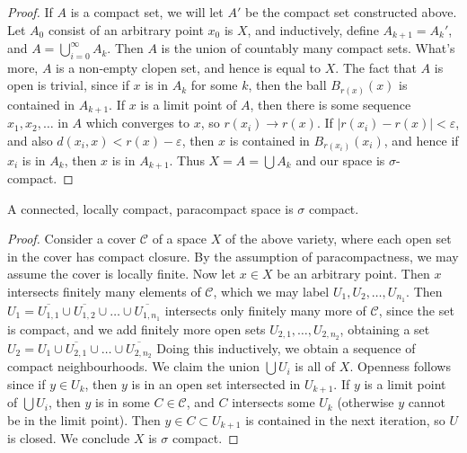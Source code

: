 \begin{proof}
    If $A$ is a compact set, we will let $A'$ be the compact set constructed above. Let $A_0$ consist of an arbitrary point $x_0$ is $X$, and inductively, define $A_{k+1} = A_k'$, and $A = \bigcup_{i = 0}^\infty A_k$. Then $A$ is the union of countably many compact sets. What's more, $A$ is a non-empty clopen set, and hence is equal to $X$. The fact that $A$ is open is trivial, since if $x$ is in $A_k$ for some $k$, then the ball $B_{r(x)}(x)$ is contained in $A_{k+1}$. If $x$ is a limit point of $A$, then there is some sequence $x_1, x_2, \dots$ in $A$ which converges to $x$, so $r(x_i) \to r(x)$. If $|r(x_i) - r(x)| < \varepsilon$, and also $d(x_i,x) < r(x) - \varepsilon$, then $x$ is contained in $B_{r(x_i)}(x_i)$, and hence if $x_i$ is in $A_k$, then $x$ is in $A_{k+1}$. Thus $X = A = \bigcup A_k$ and our space is $\sigma$-compact.
\end{proof}

\begin{lemma}[$4) \to (1$]
    A connected, locally compact, paracompact space is $\sigma$ compact.
\end{lemma}
\begin{proof}
    Consider a cover $\mathcal{C}$ of a space $X$ of the above variety, where each open set in the cover has compact closure. By the assumption of paracompactness, we may assume the cover is locally finite. Now let $x \in X$ be an arbitrary point. Then $x$ intersects finitely many elements of $\mathcal{C}$, which we may label $U_1, U_2, \dots, U_{n_1}$. Then $U_1 = \overline{U_{1,1}} \cup \overline{U_{1,2}} \cup \dots \cup \overline{U_{{1,n_1}}}$ intersects only finitely many more of $\mathcal{C}$, since the set is compact, and we add finitely more open sets $U_{2,1}, \dots, U_{2,n_2}$, obtaining a set $U_2 = U_1 \cup \overline{U_{2,1}} \cup \dots \cup \overline{U_{2,n_2}}$ Doing this inductively, we obtain a sequence of compact neighbourhoods. We claim the union $\bigcup U_i$ is all of $X$. Openness follows since if $y \in U_k$, then $y$ is in an open set intersected in $U_{k+1}$. If $y$ is a limit point of $\bigcup U_i$, then $y$ is in some $C \in \mathcal{C}$, and $C$ intersects some $U_k$ (otherwise $y$ cannot be in the limit point). Then $y \in C \subset U_{k+1}$ is contained in the next iteration, so $U$ is closed. We conclude $X$ is $\sigma$ compact.
\end{proof}

